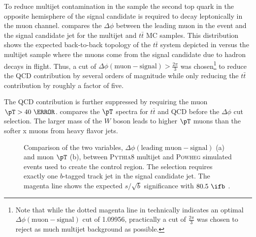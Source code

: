 To reduce multijet contamination in the sample the second top quark in the
opposite hemisphere of the signal candidate is required to decay leptonically
in the muon channel.  compares the $\Delta\phi$
between the leading muon in the event and the signal candidate jet for the
multijet and $t\bar{t}$ MC samples. This distribution shows the expected
back-to-back topology of the $t\bar{t}$ system depicted in
 versus the multijet sample where the muons
come from the signal candidate due to hadron decays in flight. Thus, a cut of
$\Delta\phi(\text{muon} - \text{signal}) > \frac{2\pi}{3}$ was
chosen\footnote{Note that while the dotted magenta line in
 technically indicates an optimal
$\Delta\phi(\text{muon} - \text{signal})$ cut of 1.09956, practically a cut of
$\frac{2\pi}{3}$ was chosen to reject as much multijet background as possible.}
to reduce the QCD contribution by several orders of magnitude while only
reducing the $t\bar{t}$ contribution by roughly a factor of five.

The QCD contribution is further suppressed by requiring the muon $\pT >40~\GeV$.
 compares the $\pT$ spectra for $t\bar{t}$ and
QCD before the $\Delta\phi$ cut selection. The larger mass of the $W$
boson leads to higher $\pT$ muons than the softer x muons from heavy flavor jets.

\begin{figure}[!htbp]
\centering
{}\hfill
{}
\caption{Comparison of the two variables, $\Delta \phi(\text{leading muon}-\text{signal})$ (a) and muon $\pT$ (b), between \textsc{Pythia}8 multijet and \textsc{Powheg} \ttbar simulated events used to create the \ttbar control region. The selection requires exactly one $b$-tagged track jet in the signal candidate \largeR jet. The magenta line shows the expected $s/\sqrt{b}$ significance with $80.5~\ifb$ \cite{Alison:2649017}.}
\label{sec:background:qcd_rejection_studies}
\end{figure}

